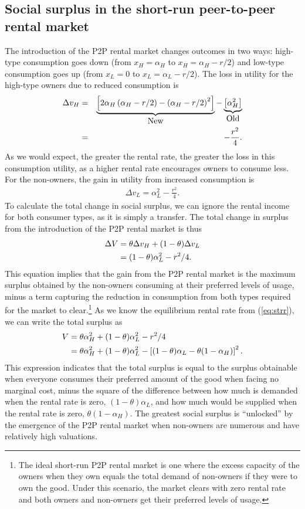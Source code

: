 \documentclass[11pt]{article}
\begin{document}
\subsection{Social surplus in the short-run peer-to-peer rental market}
The introduction of the P2P rental market changes outcomes in two ways: 
high-type consumption goes down (from $x_H = \alpha_H$ to  $x_H = \alpha_H - r/2$) and low-type consumption goes up (from $x_L = 0$ to $x_L = \alpha_L - r/2$). 
The loss in utility for the high-type owners due to reduced consumption is 
\begin{eqnarray}
\Delta v_H &=& \underbrace{\left[2 \alpha_H \left(\alpha_H - r/2\right) - \left(\alpha_H - r/2\right)^2 \right]}_{\mbox{New}} - 
                             \underbrace{\left[\alpha_H^2 \right]}_{\mbox{Old}}   \notag \\
           &=& - \frac{r^2}{4}. 
\end{eqnarray} 
As we would expect, the greater the rental rate, the greater the loss in this consumption utility, as a higher rental rate encourages owners to consume less. 
For the non-owners, the gain in utility from increased consumption is
\begin{align}
\Delta v_L = \alpha_L^2 - \frac{r^2}{4}. 
\end{align} 
To calculate the total change in social surplus, we can ignore the rental income for both consumer types, as it is simply a transfer. 
The total change in surplus from the introduction of the P2P rental market is thus 
\begin{align}
\Delta V &= \theta \Delta v_H + (1-\theta) \Delta v_L \notag \\ 
         & = (1-\theta) \alpha_L^2 - r^2/4.
\end{align}
This equation implies that the gain from the P2P rental market is the
maximum surplus obtained by the non-owners consuming at their
preferred levels of usage, minus a term capturing the reduction in consumption from both types required for the market to clear.\footnote{
  The ideal short-run P2P rental market is one where the excess capacity of the owners when they own equals the total demand of non-owners if they were to own the good.
  Under this scenario, the market clears with zero rental rate and both owners and non-owners get their preferred levels of usage. 
}
As we know the equilibrium rental rate from (\ref{eq:strr}), we can write the total surplus as
\begin{align}
  V & = \theta \alpha_H^2 + (1-\theta)\alpha_L^2 - r^2/4 \notag \\
    & = \theta \alpha_H^2 + (1-\theta)\alpha_L^2 - \left[(1-\theta) \alpha_L - \theta (1-\alpha_H) \right]^2.
\end{align} 
This expression indicates that the total surplus is equal to the surplus obtainable when everyone consumes their preferred amount of the good when facing no marginal cost, minus the square of the difference between how much is demanded when the rental rate is zero, $(1-\theta)\alpha_L$, and how much would be supplied when the rental rate is zero, $\theta (1-\alpha_H)$.
The greatest social surplus is ``unlocked'' by the emergence of the P2P rental market when non-owners are numerous and have relatively high valuations. 
\end{document}
